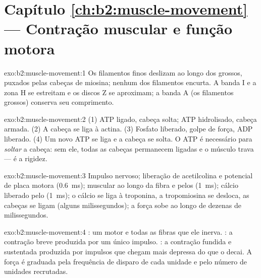 \section*{Capítulo \ref{ch:b2:muscle-movement} --- Contração muscular e função motora}

\begin{solution}{exo:b2:muscle-movement:1}
Os filamentos finos deslizam ao longo dos grossos, puxados pelas
cabeças de miosina; nenhum dos filamentos encurta. A banda I e a zona H
se estreitam e os discos Z se aproximam; a banda A (os filamentos
grossos) conserva seu comprimento.
\end{solution}

\begin{solution}{exo:b2:muscle-movement:2}
(1) ATP ligado, cabeça solta; ATP hidrolisado, cabeça armada. (2) A
cabeça se liga à actina. (3) Fosfato liberado, golpe de força, ADP
liberado. (4) Um novo ATP se liga e a cabeça se solta. O ATP é
necessário para \emph{soltar} a cabeça: sem ele, todas as cabeças
permanecem ligadas e o músculo trava --- é a rigidez.
\end{solution}

\begin{solution}{exo:b2:muscle-movement:3}
Impulso nervoso; liberação de acetilcolina e potencial de placa motora
(\qty{0.6}{ms});  muscular ao longo da fibra e pelos
 (\qty{1}{ms}); cálcio liberado pelo 
(\qty{1}{ms}); o cálcio se liga à troponina, a tropomiosina se desloca,
as cabeças se ligam (alguns milissegundos); a força sobe ao longo de
dezenas de milissegundos.
\end{solution}

\begin{solution}{exo:b2:muscle-movement:4}
: um  motor e todas as fibras que ele inerva.
: a contração breve produzida por um único impulso. : a
contração fundida e sustentada produzida por impulsos que chegam mais
depressa do que o  decai. A força é graduada pela frequência de
disparo de cada unidade e pelo número de unidades recrutadas.
\end{solution}

